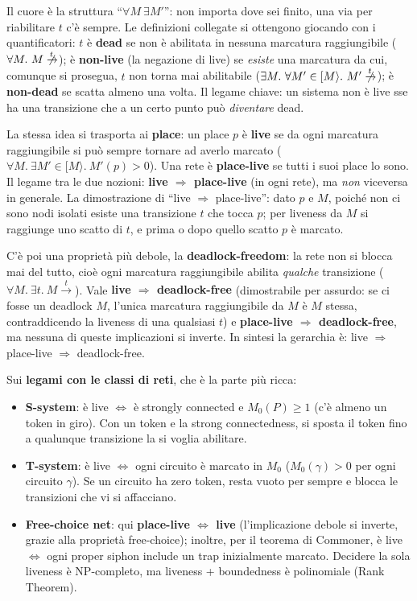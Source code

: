 Il cuore è la struttura ``$\forall M\ \exists M'$'': non importa dove sei finito, una via per riabilitare $t$ c'è sempre. Le definizioni collegate si ottengono giocando con i quantificatori: $t$ è \textbf{dead} se non è abilitata in nessuna marcatura raggiungibile ($\forall M.\ M\centernot{\xrightarrow{t}}$); è \textbf{non-live} (la negazione di live) se \emph{esiste} una marcatura da cui, comunque si prosegua, $t$ non torna mai abilitabile ($\exists M.\ \forall M'\in[M\rangle.\ M'\centernot{\xrightarrow{t}}$); è \textbf{non-dead} se scatta almeno una volta. Il legame chiave: un sistema non è live sse ha una transizione che a un certo punto può \emph{diventare} dead.

La stessa idea si trasporta ai \textbf{place}: un place $p$ è \textbf{live} se da ogni marcatura raggiungibile si può sempre tornare ad averlo marcato ($\forall M.\ \exists M'\in[M\rangle.\ M'(p)>0$). Una rete è \textbf{place-live} se tutti i suoi place lo sono. Il legame tra le due nozioni: \textbf{live $\Rightarrow$ place-live} (in ogni rete), ma \emph{non} viceversa in generale. La dimostrazione di ``live $\Rightarrow$ place-live'': dato $p$ e $M$, poiché non ci sono nodi isolati esiste una transizione $t$ che tocca $p$; per liveness da $M$ si raggiunge uno scatto di $t$, e prima o dopo quello scatto $p$ è marcato.

C'è poi una proprietà più debole, la \textbf{deadlock-freedom}: la rete non si blocca mai del tutto, cioè ogni marcatura raggiungibile abilita \emph{qualche} transizione ($\forall M.\ \exists t.\ M\xrightarrow{t}$). Vale \textbf{live $\Rightarrow$ deadlock-free} (dimostrabile per assurdo: se ci fosse un deadlock $M$, l'unica marcatura raggiungibile da $M$ è $M$ stessa, contraddicendo la liveness di una qualsiasi $t$) e \textbf{place-live $\Rightarrow$ deadlock-free}, ma nessuna di queste implicazioni si inverte. In sintesi la gerarchia è: live $\Rightarrow$ place-live $\Rightarrow$ deadlock-free.

Sui \textbf{legami con le classi di reti}, che è la parte più ricca:
\begin{itemize}
  \item \textbf{S-system}: è live $\iff$ è strongly connected e $M_0(P)\ge 1$ (c'è almeno un token in giro). Con un token e la strong connectedness, si sposta il token fino a qualunque transizione la si voglia abilitare.
  \item \textbf{T-system}: è live $\iff$ ogni circuito è marcato in $M_0$ ($M_0(\gamma)>0$ per ogni circuito $\gamma$). Se un circuito ha zero token, resta vuoto per sempre e blocca le transizioni che vi si affacciano.
  \item \textbf{Free-choice net}: qui \textbf{place-live $\iff$ live} (l'implicazione debole si inverte, grazie alla proprietà free-choice); inoltre, per il teorema di Commoner, è live $\iff$ ogni proper siphon include un trap inizialmente marcato. Decidere la sola liveness è NP-completo, ma liveness + boundedness è polinomiale (Rank Theorem).
\end{itemize}

